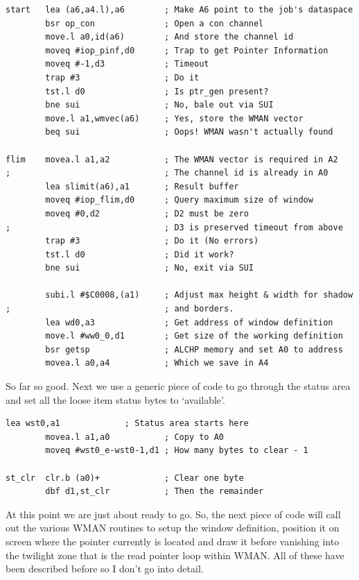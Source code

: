 \begin{lstlisting}[firstnumber=last,caption={ApplTest\_asm - Initialisation}]
start   lea (a6,a4.l),a6        ; Make A6 point to the job's dataspace
        bsr op_con              ; Open a con channel
        move.l a0,id(a6)        ; And store the channel id
        moveq #iop_pinf,d0      ; Trap to get Pointer Information
        moveq #-1,d3            ; Timeout
        trap #3                 ; Do it
        tst.l d0                ; Is ptr_gen present?
        bne sui                 ; No, bale out via SUI
        move.l a1,wmvec(a6)     ; Yes, store the WMAN vector
        beq sui                 ; Oops! WMAN wasn't actually found

flim    movea.l a1,a2           ; The WMAN vector is required in A2
;                               ; The channel id is already in A0
        lea slimit(a6),a1       ; Result buffer
        moveq #iop_flim,d0      ; Query maximum size of window
        moveq #0,d2             ; D2 must be zero
;                               ; D3 is preserved timeout from above
        trap #3                 ; Do it (No errors)
        tst.l d0                ; Did it work?
        bne sui                 ; No, exit via SUI

        subi.l #$C0008,(a1)     ; Adjust max height & width for shadow
;                               ; and borders. 
        lea wd0,a3              ; Get address of window definition
        move.l #ww0_0,d1        ; Get size of the working definition
        bsr getsp               ; ALCHP memory and set A0 to address
        movea.l a0,a4           ; Which we save in A4
\end{lstlisting}

So far so good. Next we use a generic piece of code to go through
    the status area and set all the loose item status bytes to
    `available'.

\begin{lstlisting}[firstnumber=last,caption={ApplTest\_asm - Loose Item Initialisation}]
        lea wst0,a1             ; Status area starts here
        movea.l a1,a0           ; Copy to A0
        moveq #wst0_e-wst0-1,d1 ; How many bytes to clear - 1

st_clr  clr.b (a0)+             ; Clear one byte
        dbf d1,st_clr           ; Then the remainder
\end{lstlisting}

At this point we are just about ready to go. So, the next piece of
    code will call out the various WMAN routines to
    setup the window definition, position it on screen where the pointer
    currently is located and draw it before vanishing into the twilight zone
    that is the read pointer loop within WMAN. All
    of these have been described before so I don't go into detail.

